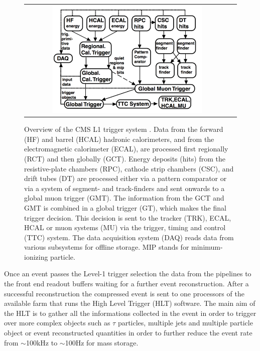 \begin{figure}[tbh!]
	\centering
	\begin{tabular}{cc}
		\includegraphics[width=0.75\textwidth]{detector/pics/trigger_lvl1.pdf}
	\end{tabular}
	\caption{Overview of the CMS L1 trigger system \cite{Khachatryan:2016bia}. Data from the forward (HF) and barrel (HCAL) hadronic calorimeters, and from the electromagnetic calorimeter (ECAL), are processed first regionally (RCT) and then globally (GCT). Energy deposits (hits) from the resistive-plate chambers (RPC), cathode strip chambers (CSC), and drift tubes (DT) are processed either via a pattern comparator or via a system of segment- and track-finders and sent onwards to a global muon trigger (GMT). The information from the GCT and GMT is combined in a global trigger (GT), which makes the final trigger decision. This decision is sent to the tracker (TRK), ECAL, HCAL or muon systems (MU) via the trigger, timing and control (TTC) system. The data acquisition system (DAQ) reads data from various subsystems for offline storage. MIP stands for minimum-ionizing particle.}
	\label{fig:CMS_trigger}
\end{figure}

Once an event passes the Level-1 trigger selection the data from the pipelines to the front end readout buffers waiting for a further event reconstruction. After a successful reconstruction the compressed event is sent to one processors of the available farm that runs the High Level Trigger (HLT) software. The main aim of the HLT is to gather all the informations collected in the event in order to trigger over more complex objects such as $\tau$ particles, multiple jets and multiple particle object or event reconstructed quantities in order to further reduce the event rate from $\sim$100kHz to $\sim$100Hz for mass storage.

